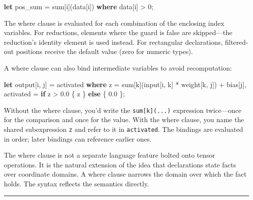 \documentclass[11pt,]{article}
\newenvironment{Shaded}{}{}
\newcommand{\DecValTok}[1]{\textcolor[rgb]{0.25,0.63,0.44}{#1}}
\newcommand{\KeywordTok}[1]{\textcolor[rgb]{0.00,0.44,0.13}{\textbf{#1}}}
\newcommand{\NormalTok}[1]{#1}
\newcommand{\OperatorTok}[1]{\textcolor[rgb]{0.40,0.40,0.40}{#1}}
\begin{document}
\begin{Shaded}
\begin{Highlighting}[]
\KeywordTok{let}\NormalTok{ pos_sum = sum}\OperatorTok{[}\NormalTok{i}\OperatorTok{]}\NormalTok{(data}\OperatorTok{[}\NormalTok{i}\OperatorTok{]}\NormalTok{) }\KeywordTok{where}\NormalTok{ data}\OperatorTok{[}\NormalTok{i}\OperatorTok{]}\NormalTok{ > }\DecValTok{0}\NormalTok{;}
\end{Highlighting}
\end{Shaded}

The where clause is evaluated for each combination of the enclosing
index variables. For reductions, elements where the guard is false are
skipped---the reduction's identity element is used instead. For
rectangular declarations, filtered-out positions receive the default
value (zero for numeric types).

A where clause can also bind intermediate variables to avoid
recomputation:

\begin{Shaded}
\begin{Highlighting}[]
\KeywordTok{let}\NormalTok{ output}\OperatorTok{[}\NormalTok{i, j}\OperatorTok{]}\NormalTok{ = activated}
    \KeywordTok{where}\NormalTok{ z = sum}\OperatorTok{[}\NormalTok{k}\OperatorTok{]}\NormalTok{(input}\OperatorTok{[}\NormalTok{i, k}\OperatorTok{]}\NormalTok{ * weight}\OperatorTok{[}\NormalTok{k, j}\OperatorTok{]}\NormalTok{) + bias}\OperatorTok{[}\NormalTok{j}\OperatorTok{]}\NormalTok{,}
\NormalTok{          activated = }\KeywordTok{if}\NormalTok{ z > }\DecValTok{0.0} \OperatorTok{\{}\NormalTok{ z }\OperatorTok{\}} \KeywordTok{else} \OperatorTok{\{} \DecValTok{0.0} \OperatorTok{\}}\NormalTok{;}
\end{Highlighting}
\end{Shaded}

Without the where clause, you'd write the \texttt{sum{[}k{]}(...)}
expression twice---once for the comparison and once for the value. With
the where clause, you name the shared subexpression \texttt{z} and refer
to it in \texttt{activated}. The bindings are evaluated in order; later
bindings can reference earlier ones.

The where clause is not a separate language feature bolted onto tensor
operations. It is the natural extension of the idea that declarations
state facts over coordinate domains. A where clause narrows the domain
over which the fact holds. The syntax reflects the semantics directly.

\begin{center}\rule{0.5\linewidth}{0.4pt}\end{center}
\end{document}

